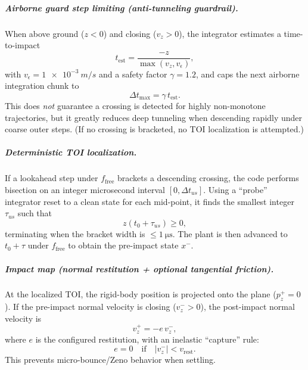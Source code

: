 \subparagraph{Airborne guard step limiting (anti-tunneling guardrail).}
When above ground (\(z<0\)) and closing (\(v_z>0\)), the integrator estimates a time-to-impact
\begin{equation}
  t_{\mathrm{est}} = \frac{-z}{\max(v_z, v_{\epsilon})},
\end{equation}
with \(v_{\epsilon}=\SI{1e-3}{m/s}\) and a safety factor \(\gamma=1.2\), and caps the next airborne integration chunk to
\begin{equation}
  \Delta t_{\max} = \gamma\,t_{\mathrm{est}}.
\end{equation}
This does \emph{not} guarantee a crossing is detected for highly non-monotone trajectories, but it greatly reduces deep tunneling when descending rapidly under coarse outer steps. (If no crossing is bracketed, no TOI localization is attempted.)

\subparagraph{Deterministic TOI localization.}
If a lookahead step under \(f_{\mathrm{free}}\) brackets a descending crossing, the code performs bisection on an integer microsecond interval \([0, \Delta t_{us}]\). Using a ``probe'' integrator reset to a clean state for each mid-point, it finds the smallest integer \(\tau_{us}\) such that
\begin{equation}
  z(t_0 + \tau_{us}) \ge 0,
\end{equation}
terminating when the bracket width is \(\le \SI{1}{\micro\second}\). The plant is then advanced to \(t_0+\tau\) under \(f_{\mathrm{free}}\) to obtain the pre-impact state \(x^{-}\).

\subparagraph{Impact map (normal restitution + optional tangential friction).}
At the localized TOI, the rigid-body position is projected onto the plane (\(p^{+}_{z}=0\)). If the pre-impact normal velocity is closing (\(v^{-}_{z}>0\)), the post-impact normal velocity is
\begin{equation}
  v^{+}_{z} = -e\,v^{-}_{z},
\end{equation}
where \(e\) is the configured restitution, with an inelastic ``capture'' rule:
\begin{equation}
  e = 0 \quad\text{if}\quad |v^{-}_{z}| < v_{\mathrm{rest}}.
\end{equation}
This prevents micro-bounce/Zeno behavior when settling.

